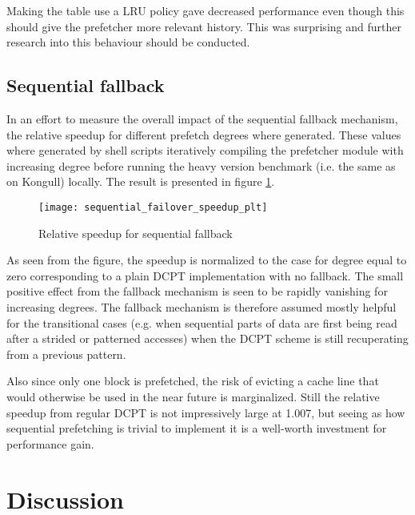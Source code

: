 \documentclass[12pt,journal,compsoc]{IEEEtran}
\begin{document}
Making the table use a LRU policy gave decreased performance even though this
should give the prefetcher more relevant history. This was surprising and
further research into this behaviour should be conducted.

\subsection{Sequential fallback}
In an effort to measure the overall impact of the sequential fallback
mechanism, the relative speedup for different prefetch degrees where
generated. These values where generated by shell scripts iteratively
compiling the prefetcher module with increasing degree before running
the heavy version benchmark (i.e. the same as on Kongull) locally. The
result is presented in figure \ref{fig:fallback}.

\begin{figure}
\begin{center}
\texttt{[image: sequential\_failover\_speedup\_plt]}
\end{center}
\caption{\label{fig:fallback} Relative speedup for sequential fallback}
\end{figure}

As seen from the figure, the speedup is normalized to the case for degree equal
to zero corresponding to a plain DCPT implementation with no fallback. The
small positive effect from the fallback mechanism is seen to be rapidly
vanishing for increasing degrees. The fallback mechanism is therefore assumed
mostly helpful for the transitional cases (e.g. when sequential parts of data
are first being read after a strided or patterned accesses) when the DCPT
scheme is still recuperating from a previous pattern.

Also since only one block is prefetched, the risk of evicting a cache line
that would otherwise be used in the near future is marginalized. Still the
relative speedup from regular DCPT is not impressively large at 1.007, but
seeing as how sequential prefetching is trivial to implement it is a
well-worth investment for performance gain.

\section{Discussion}
\end{document}
